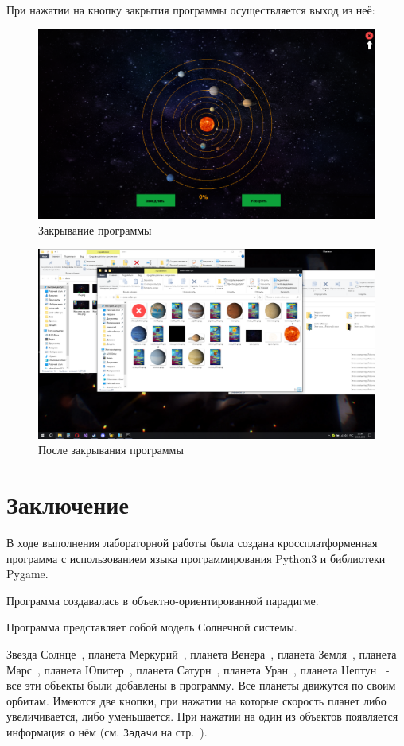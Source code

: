\documentclass[14pt, oneside]{altsu-report}
\begin{document}
При нажатии на кнопку закрытия программы осуществляется выход из неё:
\begin{figure}[H]
    \centering
    \includegraphics[width=0.8\linewidth]{src/test/Закрытие_программы.png}
    \caption{Закрывание программы}
    \label{fig:click-close-programm}
\end{figure}
\begin{figure}[H]
    \centering
    \includegraphics[width=0.8\linewidth]{src/test/После_закрытия_программы.png}
    \caption{После закрывания программы}
    \label{fig:after-close-programm}
\end{figure}

\chapter*{Заключение}
В ходе выполнения лабораторной работы была создана кроссплатформенная программа с использованием языка программирования Python3 и библиотеки Pygame.

Программа создавалась в объектно-ориентированной парадигме.

Программа представляет собой модель Солнечной системы.

Звезда Солнце~\cite{infoRUsun}, планета Меркурий~\cite{infoRUmercuri}, планета Венера~\cite{infoRUvenera}, планета Земля~\cite{infoRUearth}, планета Марс~\cite{infoRUmars}, планета Юпитер~\cite{infoRUjupiter}, планета Сатурн~\cite{infoRUsaturn}, планета Уран~\cite{infoRUuran}, планета Нептун~\cite{infoRUneptun} - все эти объекты были добавлены в программу. Все планеты движутся по своим орбитам. Имеются две кнопки, при нажатии на которые скорость планет либо увеличивается, либо уменьшается. При нажатии на один из объектов появляется информация о нём (см. \texttt{Задачи} на стр.~\pageref{zadachi}).
\end{document}
